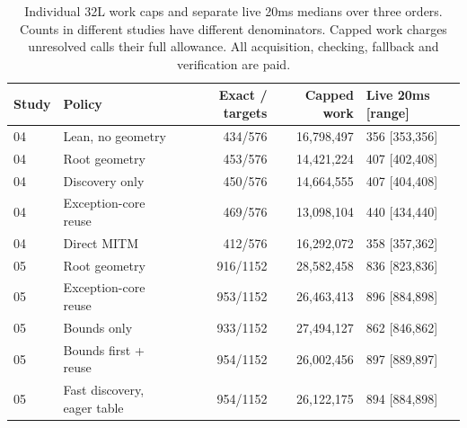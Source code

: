 \begin{table}[htbp]
\centering\small
\begin{tabular}{@{}llrrl@{}}
\toprule
Study & Policy & Exact / targets & Capped work & Live 20ms [range] \\
\midrule
04 & Lean, no geometry & 434/576 & 16,798,497 & 356 [353,356] \\
04 & Root geometry & 453/576 & 14,421,224 & 407 [402,408] \\
04 & Discovery only & 450/576 & 14,664,555 & 407 [404,408] \\
04 & Exception-core reuse & 469/576 & 13,098,104 & 440 [434,440] \\
04 & Direct MITM & 412/576 & 16,292,072 & 358 [357,362] \\
\midrule
05 & Root geometry & 916/1152 & 28,582,458 & 836 [823,836] \\
05 & Exception-core reuse & 953/1152 & 26,463,413 & 896 [884,898] \\
05 & Bounds only & 933/1152 & 27,494,127 & 862 [846,862] \\
05 & Bounds first + reuse & 954/1152 & 26,002,456 & 897 [889,897] \\
05 & Fast discovery, eager table & 954/1152 & 26,122,175 & 894 [884,898] \\
\bottomrule
\end{tabular}
\caption{Individual 32L work caps and separate live 20ms medians over three orders. Counts in different studies have different denominators. Capped work charges unresolved calls their full allowance. All acquisition, checking, fallback and verification are paid.}
\label{tab:results}
\end{table}
